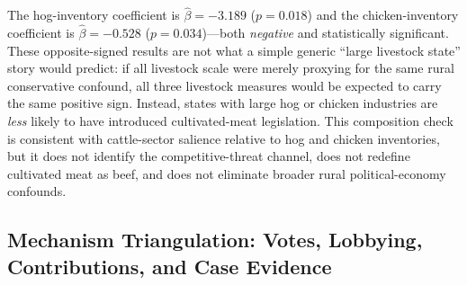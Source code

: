 \documentclass[12pt]{article}
\begin{document}
The hog-inventory coefficient is $\hat{\beta} = -3.189$ ($p = 0.018$) and the chicken-inventory coefficient is $\hat{\beta} = -0.528$ ($p = 0.034$)---both \emph{negative} and statistically significant.  These opposite-signed results are not what a simple generic ``large livestock state'' story would predict: if all livestock scale were merely proxying for the same rural conservative confound, all three livestock measures would be expected to carry the same positive sign.  Instead, states with large hog or chicken industries are \emph{less} likely to have introduced cultivated-meat legislation.  This composition check is consistent with cattle-sector salience relative to hog and chicken inventories, but it does not identify the competitive-threat channel, does not redefine cultivated meat as beef, and does not eliminate broader rural political-economy confounds.

\subsection{Mechanism Triangulation: Votes, Lobbying, Contributions, and Case Evidence}
\label{sec:mechanism}
\end{document}
